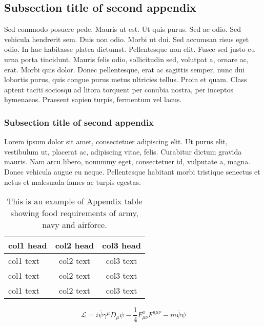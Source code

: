 \documentclass[AMA,STIX2COL,Linenumberson]{MRM}
\begin{document}
\subsection{Subsection title of second appendix\label{app2.1a}}

Sed commodo posuere pede. Mauris ut est. Ut quis purus. Sed ac odio. Sed vehicula hendrerit sem. Duis non odio.
Morbi ut dui. Sed accumsan risus eget odio. In hac habitasse platea dictumst. Pellentesque non elit. Fusce sed justo
eu urna porta tincidunt. Mauris felis odio, sollicitudin sed, volutpat a, ornare ac, erat. Morbi quis dolor. Donec
pellentesque, erat ac sagittis semper, nunc dui lobortis purus, quis congue purus metus ultricies tellus. Proin et quam.
Class aptent taciti sociosqu ad litora torquent per conubia nostra, per inceptos hymenaeos. Praesent sapien turpis,
fermentum vel lacus.

\subsubsection{Subsection title of second appendix\label{app2.1.1a}}
Lorem ipsum dolor sit amet, consectetuer adipiscing elit. Ut purus elit, vestibulum ut, placerat ac, adipiscing vitae,
felis. Curabitur dictum gravida mauris. Nam arcu libero, nonummy eget, consectetuer id, vulputate a, magna. Donec
vehicula augue eu neque. Pellentesque habitant morbi tristique senectus et netus et malesuada fames ac turpis egestas.


\begin{table}[b]%
\caption{This is an example of Appendix table showing food requirements of army, navy and airforce.\label{tab4}}%
\begin{tabular*}{\columnwidth}{@{\extracolsep\fill}lcc@{\extracolsep\fill}}%
\toprule
\textbf{col1 head} & \textbf{col2 head} & \textbf{col3 head} \\
\midrule
col1 text & col2 text & col3 text \\
col1 text & col2 text & col3 text \\
col1 text & col2 text & col3 text\\
\bottomrule
\end{tabular*}
\end{table}

\begin{equation}
\mathcal{L} = i \bar{\psi} \gamma^\mu D_\mu \psi
    - \frac{1}{4} F_{\mu\nu}^a F^{a\mu\nu} - m \bar{\psi} \psi
\label{eq26}
\end{equation}
\end{document}
